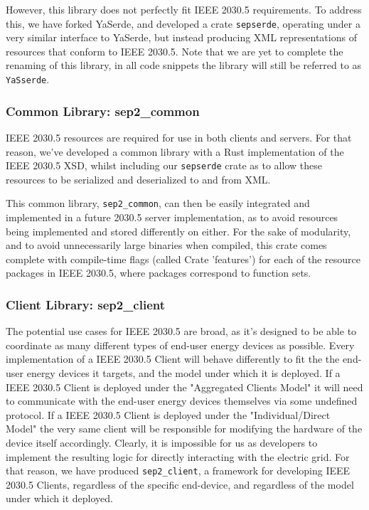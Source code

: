 However, this library does not perfectly fit IEEE 2030.5 requirements. To address this, we have forked YaSerde, and developed a crate \texttt{sepserde}, operating under a very similar interface to YaSerde, but instead producing XML representations of resources that conform to IEEE 2030.5.
Note that we are yet to complete the renaming of this library, in all code snippets the library will still be referred to as \texttt{YaSserde}.

\subsubsection{Common Library: \- sep2\_common}
IEEE 2030.5 resources are required for use in both clients and servers. For that reason, we've developed a common library with a Rust implementation of the IEEE 2030.5 XSD, whilst including our \texttt{sepserde} crate as to allow these resources to be serialized and deserialized to and from XML.

This common library, \texttt{sep2\_common}, can then be easily integrated and implemented in a future 2030.5 server implementation, as to avoid resources being implemented and stored differently on either. 
For the sake of modularity, and to avoid unnecessarily large binaries when compiled, this crate comes complete with compile-time flags (called Crate 'features') for each of the resource packages in IEEE 2030.5, where packages correspond to function sets.

\subsubsection{Client Library: \- sep2\_client}
The potential use cases for IEEE 2030.5 are broad, as it's designed to be able to coordinate as many different types of end-user energy devices as possible.
Every implementation of a IEEE 2030.5 Client will behave differently to fit the the end-user energy devices it targets, and the model under which it is deployed. 
If a IEEE 2030.5 Client is deployed under the "Aggregated Clients Model" it will need to communicate with the end-user energy devices themselves via some undefined protocol.
If a IEEE 2030.5 Client is deployed under the "Individual/Direct Model" the very same client will be responsible for modifying the hardware of the device itself accordingly. 
Clearly, it is impossible for us as developers to implement the resulting logic for directly interacting with the electric grid.
For that reason, we have produced \texttt{sep2\_client}, a framework for developing IEEE 2030.5 Clients, regardless of the specific end-device, and regardless of the model under which it deployed.

